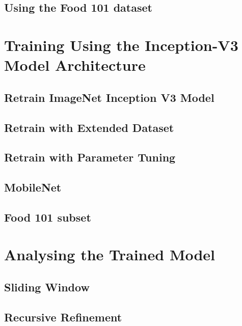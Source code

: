 \section{Using the Food 101 dataset}
\label{food101}


\chapter{Training Using the Inception-V3 Model Architecture}

\section{Retrain ImageNet Inception V3 Model}
\label{inception}


\section{Retrain with Extended Dataset}
\label{extended}


\section{Retrain with Parameter Tuning}
\label{parameterTuning}


\section{MobileNet}
\label{mobilenet}


\section{Food 101 subset}
\label{subset}


\chapter{Analysing the Trained Model}

\section{Sliding Window}
\label{slidingWindow}


\section{Recursive Refinement}
\label{RR}


